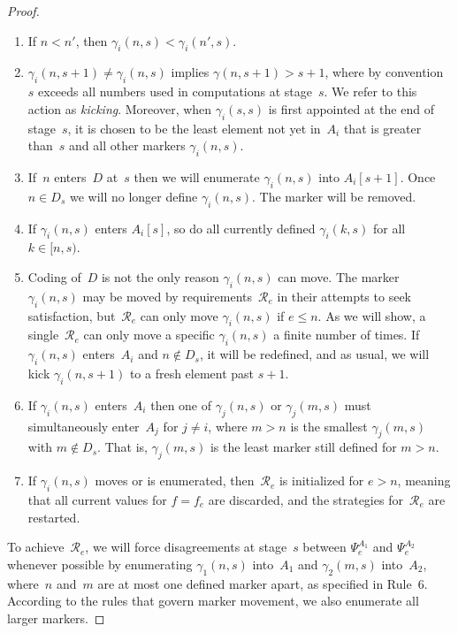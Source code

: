 \documentclass{LMCS}
\newcommand{\0}{\mathbf{0}}
\newcommand{\<}{\langle}
\renewcommand{\>}{\rangle}
\begin{document}
\begin{proof}
\begin{enumerate}
\item If $n<n'$, then $\gamma_i(n,s)<\gamma_i(n',s)$.
\item $\gamma_i(n,s+1)\ne \gamma_i(n,s)$ implies $\gamma(n,s+1)>s+1$,
    where by convention~$s$ exceeds all numbers used in computations at
    stage~$s$. We refer to this action as \emph{kicking}. Moreover, when
    $\gamma_i(s,s)$ is first appointed at the end of stage~$s$, it is
    chosen to be the least element not yet in~$A_i$ that is greater
    than~$s$ and all other markers $\gamma_i(n,s)$.
\item If~$n$ enters~$D$ at~$s$ then we will  enumerate $\gamma_i(n,s)$
    into $A_i[s+1]$.
Once $n\in D_s$ we will no longer define $\gamma_i(n,s)$.  The marker
will be removed.
\item If $\gamma_i(n,s)$ enters $A_i[s]$, so do all currently defined
    $\gamma_i(k,s)$ for all $k\in [n,s)$.
\item Coding of~$D$ is not the only reason $\gamma_i(n,s)$ can move. The
    marker $\gamma_i(n,s)$ may be moved by requirements~$\mathcal R_e$ in
    their attempts to seek satisfaction, but~$\mathcal R_e$ can only move
    $\gamma_i(n,s)$ if $e\le n$. As we will show, a single~$\mathcal R_e$
    can only move a specific $\gamma_i(n,s)$ a finite number of times. If
    $\gamma_i(n,s)$  enters~$A_i$ and $n\not \in D_s$, it will be
    redefined, and as usual, we will kick $\gamma_i(n,s+1)$ to a fresh
    element past $s+1$.
\item If $\gamma_i(n,s)$ enters~$A_i$ then one of $\gamma_j(n,s)$ or
    $\gamma_j(m,s)$ must simultaneously enter~$A_j$ for $j\ne i$, where
    $m>n$ is the smallest $\gamma_j(m,s)$ with $m\not\in D_s$.  That is,
    $\gamma_j(m,s)$ is the least marker still defined for $m>n$.
\item If $\gamma_i(n,s)$ moves or is enumerated, then~$\mathcal R_e$ is
    initialized for $e>n$, meaning that all current values for $f=f_e$
    are discarded, and the strategies for~$\mathcal R_e$ are restarted.
\end{enumerate}

\noindent To achieve~$\mathcal R_e$, we will force disagreements at stage~$s$ between
$\Psi_e^{A_1}$ and $\Psi_e^{A_2}$ whenever possible by enumerating
$\gamma_1(n,s)$ into~$A_1$ and $\gamma_2(m,s)$ into~$A_2$, where~$n$ and~$m$
are at most one defined marker apart, as specified in Rule~6.  According to
the rules that govern marker movement, we also enumerate all larger markers.


\end{proof}
\end{document}
